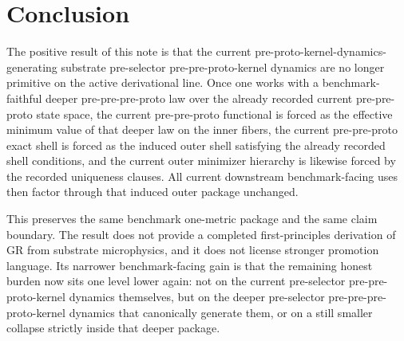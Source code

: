 \documentclass[11pt]{article}
\begin{document}
\section{Conclusion}

The positive result of this note is that the current pre-proto-kernel-dynamics-generating substrate pre-selector pre-pre-proto-kernel dynamics are no longer primitive on the active derivational line. Once one works with a benchmark-faithful deeper pre-pre-pre-proto law over the already recorded current pre-pre-proto state space, the current pre-pre-proto functional is forced as the effective minimum value of that deeper law on the inner fibers, the current pre-pre-proto exact shell is forced as the induced outer shell satisfying the already recorded shell conditions, and the current outer minimizer hierarchy is likewise forced by the recorded uniqueness clauses. All current downstream benchmark-facing uses then factor through that induced outer package unchanged.

This preserves the same benchmark one-metric package and the same claim boundary. The result does not provide a completed first-principles derivation of GR from substrate microphysics, and it does not license stronger promotion language. Its narrower benchmark-facing gain is that the remaining honest burden now sits one level lower again: not on the current pre-selector pre-pre-proto-kernel dynamics themselves, but on the deeper pre-selector pre-pre-pre-proto-kernel dynamics that canonically generate them, or on a still smaller collapse strictly inside that deeper package.
\end{document}
